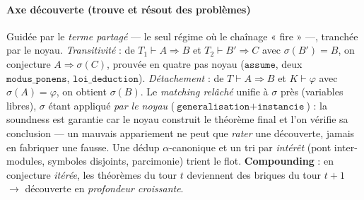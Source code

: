 \paragraph{Axe découverte (trouve et résout des problèmes)} Guidée par le
\emph{terme partagé} --- le seul régime où le chaînage « fire » ---, tranchée par
le noyau. \emph{Transitivité} : de $T_1\vdash A\Rightarrow B$ et
$T_2\vdash B'\Rightarrow C$ avec $\sigma(B')=B$, on conjecture $A\Rightarrow\sigma(C)$,
prouvée en quatre pas noyau ($\texttt{assume}$, deux $\texttt{modus\_ponens}$,
$\texttt{loi\_deduction}$). \emph{Détachement} : de $T\vdash A\Rightarrow B$ et
$K\vdash\varphi$ avec $\sigma(A)=\varphi$, on obtient $\sigma(B)$. Le
\emph{matching relâché} unifie à $\sigma$ près (variables libres), $\sigma$ étant
appliqué \emph{par le noyau} ($\texttt{generalisation}+\texttt{instancie}$) : la
soundness est garantie car le noyau construit le théorème final et l'on vérifie sa
conclusion --- un mauvais appariement ne peut que \emph{rater} une découverte,
jamais en fabriquer une fausse. Une dédup $\alpha$-canonique et un tri par
\emph{intérêt} (pont inter-modules, symboles disjoints, parcimonie) trient le flot.
\textbf{Compounding} : en conjecture \emph{itérée}, les théorèmes du tour $t$
deviennent des briques du tour $t{+}1$ $\to$ découverte en \emph{profondeur
croissante}.

